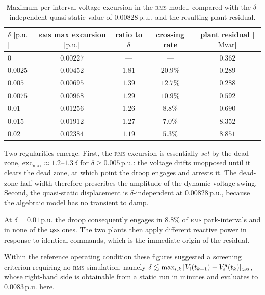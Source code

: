 \documentclass[11pt,a4paper]{article}
\newcommand{\pu}{\ensuremath{\mathrm{p.u.}}}
\newcommand{\Mvar}{\ensuremath{\mathrm{Mvar}}}
\newcommand{\qss}{\textsc{qss}}
\newcommand{\rms}{\textsc{rms}}
\begin{document}
\begin{table}[htbp]
  \centering
  \caption{Maximum per-interval voltage excursion in the \rms{} model,
  compared with the $\delta$-independent quasi-static value of
  $0.00828\,\pu$, and the resulting plant residual.}
  \label{tab:excursion}
  \begin{tabular}{lcccc}
    \toprule
    $\delta$ [\pu] & \rms{} max excursion [\pu] & ratio to $\delta$ &
    crossing rate & plant residual [\Mvar]\\
    \midrule
    $0$      & $0.00227$ & ---    & ---      & $0.362$\\
    $0.0025$ & $0.00452$ & $1.81$ & $20.9\%$ & $0.289$\\
    $0.005$  & $0.00695$ & $1.39$ & $12.7\%$ & $0.288$\\
    $0.0075$ & $0.00968$ & $1.29$ & $10.9\%$ & $0.592$\\
    $0.01$   & $0.01256$ & $1.26$ & $8.8\%$  & $0.690$\\
    $0.015$  & $0.01912$ & $1.27$ & $7.0\%$  & $8.352$\\
    $0.02$   & $0.02384$ & $1.19$ & $5.3\%$  & $8.851$\\
    \bottomrule
  \end{tabular}
\end{table}

Two regularities emerge. First, the \rms{} excursion is essentially
\emph{set} by the dead zone, $\mathrm{exc}_{\max} \approx 1.2$--$1.3\,\delta$
for $\delta \ge 0.005\,\pu$: the voltage drifts unopposed until it clears the
dead zone, at which point the droop engages and arrests it. The dead-zone
half-width therefore prescribes the amplitude of the dynamic voltage swing.
Second, the quasi-static displacement is $\delta$-independent at
$0.00828\,\pu$, because the algebraic model has no transient to damp.

At $\delta = 0.01\,\pu$ the droop consequently engages in $8.8\%$ of
\rms{} park-intervals and in none of the \qss{} ones. The two plants then
apply different reactive power in response to identical commands, which is
the immediate origin of the residual.

Within the reference operating condition these figures suggested a screening
criterion requiring no \rms{} simulation, namely $\delta \lesssim
\max_{i,k}|V_i(t_{k+1}) - V^{\mathrm{a}}_i(t_k)|_{\qss}$, whose right-hand
side is obtainable from a static run in minutes and evaluates to
$0.0083\,\pu$ here.
\end{document}
